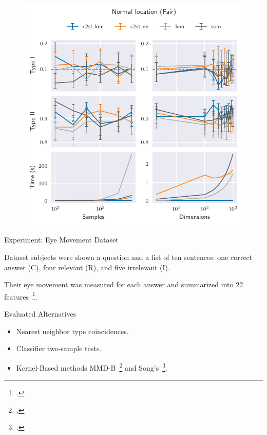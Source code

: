 \documentclass[10pt]{beamer}
\begin{document}
\begin{frame}{}
\begin{figure}
    \centering
    \includegraphics[height=\textheight]{normal_location_fair}
\end{figure}
\end{frame}

\begin{frame}{Experiment: Eye Movement Dataset}
    \begin{block}{Dataset}
         subjects were shown a question and a list of ten 
        sentences: one correct answer (C), four relevant (R), and five irrelevant (I).
        
        Their eye movement was measured for each answer and summarized into 22 features~\footcite{salojarvi2005inferring}.
    \end{block}
    \begin{block}{Evaluated Alternatives}
        \smallskip
        \begin{itemize}
            \item Nearest neighbor type coincidences.
            \item Classifier two-sample tests.
            \item Kernel-Based methods MMD-B~\footcite{zaremba2013b} and Song's~\footcite{song2021fast}.
        \end{itemize}
    \end{block}
\end{frame}
\end{document}
